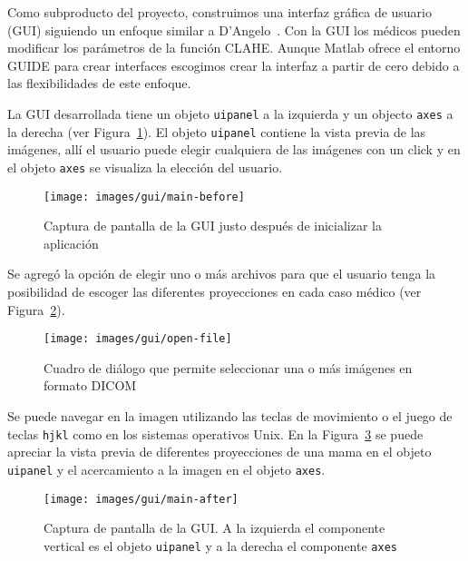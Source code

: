 Como subproducto del proyecto, construimos una interfaz gráfica de usuario
(GUI) siguiendo un enfoque similar a D'Angelo~\cite{d2007design}. Con la GUI
los médicos pueden modificar los parámetros de la función CLAHE. Aunque Matlab
ofrece el entorno GUIDE para crear interfaces escogimos crear la interfaz a
partir de cero debido a las flexibilidades de este enfoque.

La GUI desarrollada tiene un objeto \texttt{uipanel} a la izquierda y un
objecto \texttt{axes} a la derecha (ver Figura~\ref{main:before}). El objeto
\texttt{uipanel} contiene la vista previa de las imágenes, allí el usuario
puede elegir cualquiera de las imágenes con un click y en el objeto
\texttt{axes} se visualiza la elección del usuario. 

\begin{figure}[h]
  \begin{center}
    {\texttt{[image: images/gui/main-before]}}
  \end{center}
  \caption[GUI: Inicio]{Captura de pantalla de la GUI justo después de inicializar la aplicación} 
  \label{main:before} 
\end{figure}

Se agregó la opción de elegir uno o más archivos para que el usuario tenga la
posibilidad de escoger las diferentes proyecciones en cada caso médico (ver
Figura~\ref{fig:openfile}).

\begin{figure}[h]
  \begin{center}
    {\texttt{[image: images/gui/open-file]}}
  \end{center}
  \caption[GUI: Selección de archivos]
  {Cuadro de diálogo que permite seleccionar una o más imágenes en formato DICOM} 
  \label{fig:openfile} 
\end{figure}

Se puede navegar en la imagen utilizando las teclas de movimiento o el juego de
teclas \texttt{hjkl} como en los sistemas operativos Unix. En la
Figura~\ref{main:after} se puede apreciar la vista previa de diferentes
proyecciones de una mama en el objeto \texttt{uipanel} y el acercamiento a la
imagen en el objeto \texttt{axes}.

\begin{figure}[h]
  \begin{center}
    {\texttt{[image: images/gui/main-after]}}
  \end{center}

  \caption[GUI: Ventana principal 2]{Captura de pantalla de la GUI. A la
  izquierda el componente vertical es el objeto \texttt{uipanel} y a la derecha
  el componente \texttt{axes}} 

  \label{main:after} 
\end{figure}

